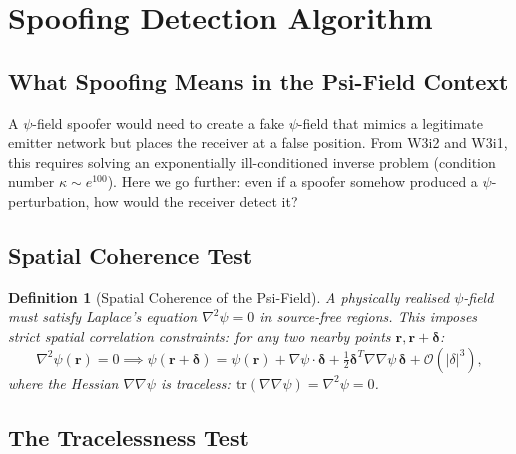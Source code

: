 \documentclass[aps,prd,twocolumn,superscriptaddress,nofootinbib]{revtex4-2}
\newcommand{\order}[1]{\mathcal{O}(#1)}
\newtheorem{definition}{Definition}
\begin{document}
\section{Spoofing Detection Algorithm}
\label{sec:spoofing}

\subsection{What Spoofing Means in the Psi-Field Context}

A $\psi$-field spoofer would need to create a fake $\psi$-field that
mimics a legitimate emitter network but places the receiver at a false
position.  From W3i2 and W3i1, this requires solving an
exponentially ill-conditioned inverse problem (condition number
$\kappa \sim e^{100}$).  Here we go further: even if a spoofer somehow
produced a $\psi$-perturbation, how would the receiver detect it?

\subsection{Spatial Coherence Test}

\begin{definition}[Spatial Coherence of the Psi-Field]
A physically realised $\psi$-field must satisfy Laplace's equation
$\nabla^2\psi = 0$ in source-free regions.  This imposes strict
spatial correlation constraints: for any two nearby points
$\mathbf{r}, \mathbf{r}+\boldsymbol{\delta}$:
\begin{equation}
  \nabla^2\psi(\mathbf{r}) = 0 \implies
  \psi(\mathbf{r}+\boldsymbol{\delta})
  = \psi(\mathbf{r}) + \nabla\psi\cdot\boldsymbol{\delta}
  + \tfrac{1}{2}\boldsymbol{\delta}^T\nabla\nabla\psi\,\boldsymbol{\delta}
  + \order{|\delta|^3},
  \label{eq:harmonic-expansion}
\end{equation}
where the Hessian $\nabla\nabla\psi$ is traceless: $\mathrm{tr}(\nabla\nabla\psi)
= \nabla^2\psi = 0$.
\end{definition}

\subsection{The Tracelessness Test}
\end{document}
